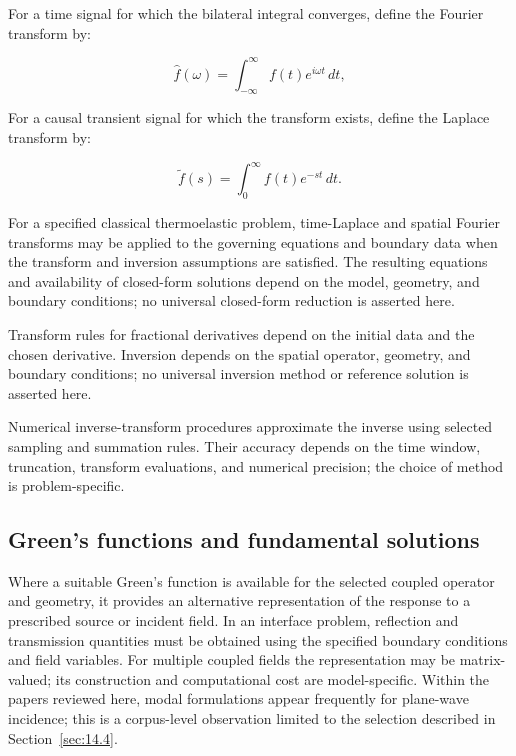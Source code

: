 For a time signal for which the bilateral integral converges, define the Fourier transform by:

\begin{equation}
\hat{f}(\omega) = \int_{-\infty}^{\infty} f(t) e^{i\omega t}\,dt,
\label{eq:8.6}
\end{equation}

For a causal transient signal for which the transform exists, define the Laplace transform by:

\begin{equation}
\tilde{f}(s) = \int_0^{\infty} f(t) e^{-st}\,dt.
\label{eq:8.7}
\end{equation}

For a specified classical thermoelastic problem, time-Laplace and spatial Fourier transforms may be applied to the governing equations and boundary data when the transform and inversion assumptions are satisfied. The resulting equations and availability of closed-form solutions depend on the model, geometry, and boundary conditions; no universal closed-form reduction is asserted here.

Transform rules for fractional derivatives depend on the initial data and the chosen derivative. Inversion depends on the spatial operator, geometry, and boundary conditions; no universal inversion method or reference solution is asserted here.

Numerical inverse-transform procedures approximate the inverse using selected sampling and summation rules. Their accuracy depends on the time window, truncation, transform evaluations, and numerical precision; the choice of method is problem-specific.

\subsection{Green's functions and fundamental solutions}
\label{sec:8.7}

Where a suitable Green's function is available for the selected coupled operator and geometry, it provides an alternative representation of the response to a prescribed source or incident field. In an interface problem, reflection and transmission quantities must be obtained using the specified boundary conditions and field variables. For multiple coupled fields the representation may be matrix-valued; its construction and computational cost are model-specific. Within the papers reviewed here, modal formulations appear frequently for plane-wave incidence; this is a corpus-level observation limited to the selection described in Section~\ref{sec:14.4}.

